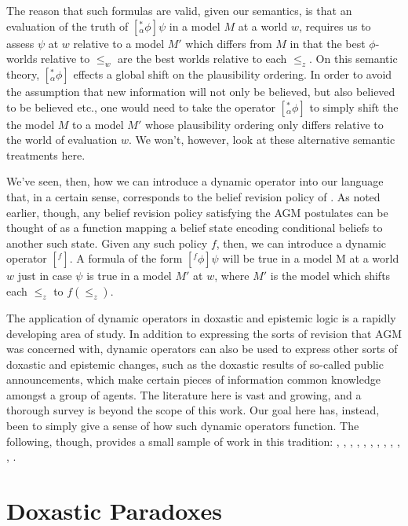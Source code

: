 The reason that such formulas are valid, given our semantics, is that an evaluation of the truth of $[^*_\alpha \phi] \psi$ in a model $M$ at a world $w$, requires us to assess $\psi$ at $w$ relative to a model $M'$ which differs from $M$ in that the best $\phi$-worlds relative to $\leq_w$ are the best worlds relative to each $\leq_z$.
On this semantic theory, $[^*_\alpha \phi]$ effects a global shift on the plausibility ordering.
In order to avoid the assumption that new information will not only be believed, but also believed to be believed etc., one would need to take the operator $[^*_\alpha \phi]$ to simply shift the the model $M$ to a model $M'$ whose plausibility ordering only differs relative to the world of evaluation $w$.
We won't, however, look at these alternative semantic treatments here.

We've seen, then, how we can introduce a dynamic operator into our language that, in a certain sense, corresponds to the belief revision policy of \citet{Boutilier1}.
As noted earlier, though, any belief revision policy satisfying the AGM postulates can be thought of as a function mapping a belief state encoding conditional beliefs to another such state.
Given any such policy $f$, then, we can introduce a dynamic operator $[^f]$.
A formula of the form $[^f \phi] \psi$ will be true in a model M at a world $w$ just in case $\psi$ is true in a model $M'$ at $w$, where $M'$ is the model which shifts each $\leq_z$ to $f(\leq_z)$.

The application of dynamic operators in doxastic and epistemic logic is a rapidly developing area of study.
In addition to expressing the sorts of revision that AGM was concerned with, dynamic operators can also be used to express other sorts of doxastic and epistemic changes, such as the doxastic results of so-called public announcements, which make certain pieces of information common knowledge amongst a group of agents.
The literature here is vast and growing, and a thorough survey is beyond the scope of this work.
Our goal here has, instead, been to simply give a sense of how such dynamic operators function.
The following, though, provides a small sample of work in this tradition: \citet{BaltagMoss1}, \citet{Segerberg2}, \citet{Segerberg1}, \citet{Ditmarsch2}, \citet{Baltagsmets1},  \citet{Baltagsmets3}, \citet{Rott1}, \citet{LeitgebSegerberg1}, \citet{vanBentham}, \citet{Ditmarsch1}, \citet{Baltagsmets2}, \citet{vanBentham2}  \citet{Girard1}.


\section{Doxastic Paradoxes}\label{caie-section4}

